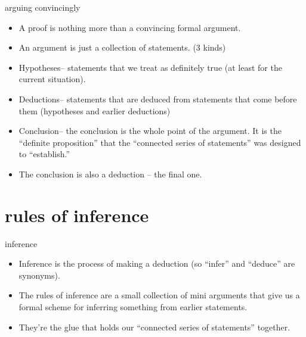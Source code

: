\documentclass[landscape]{beamer}
\begin{document}
\begin{frame}{arguing convincingly}
\begin{itemize}
\item A proof is nothing more than a convincing formal argument. \pause
\item An argument is just a collection of statements. \pause (3 kinds) \pause
\item Hypotheses\pause -- statements that we treat as definitely true (at least for the current situation). \pause
\item Deductions\pause -- statements that are deduced from statements that come before them (hypotheses and earlier deductions) \pause
\item Conclusion\pause -- the conclusion is the whole point of the argument. It is the ``definite proposition'' that the ``connected series of statements'' was designed to ``establish.'' \pause
\item The conclusion is also a deduction -- the final one.
\end{itemize}
\end{frame}

\section{rules of inference}

\begin{frame}{inference}
\begin{itemize}
\item Inference is the process of making a deduction \pause (so ``infer'' and ``deduce'' are synonyms). \pause
\item The rules of inference are a small collection of mini arguments that give us a formal scheme for inferring something from earlier statements. \pause
\item They're the glue that holds our ``connected series of statements'' together.
\end{itemize}
\end{frame}
\end{document}
